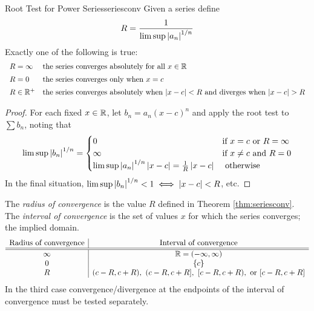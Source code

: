 \begin{thm}{Root Test for Power Series}{seriesconv}
Given a series  define\footnotemark
\[R=\frac 1{\limsup\left| a_n\right|^{1/n}}\]
Exactly one of the following is true:
\[\begin{array}{ll}
R=\infty&\text{the series converges absolutely for all $x\in\R$}\\[5pt]
R=0&\text{the series converges only when $x=c$}\\[5pt]
R\in\R^+&\text{the series converges absolutely when $\nm{x-c}<R$ and diverges when $\nm{x-c}>R$}
\end{array}\]
\end{thm}


\begin{proof}
For each fixed $x\in\mathbb{R}$, let $b_n=a_n(x-c)^n$ and apply the root test to $\sum b_n$, noting that
\begin{gather*}
\limsup\nm{b_n}^{1/n}=\begin{cases}
0&\text{if }x=c\text{ or }R=\infty\\
\infty&\text{if }x\neq c\text{ and }R=0\\
\limsup\nm{a_n}^{1/n}\nm{x-c}=\frac 1R\nm{x-c}&\text{ otherwise}
\end{cases}%
\end{gather*}
In the final situation, $\limsup\left| b_n\right|^{1/n}<1\iff \left| x-c\right|<R$, etc.
\end{proof}

\begin{defn}{}{}
The \emph{radius of convergence} is the value $R$ defined in Theorem \ref{thm:seriesconv}. The \emph{interval of convergence} is the set of values $x$ for which the series converges; the implied domain.
\[\begin{array}{c|c}
\text{Radius of convergence}&\text{Interval of convergence}\\\hline\hline
\infty&\mathbb{R}=(-\infty,\infty)\\
0&\{c\}\\
R&(c-R,c+R),\ (c-R,c+R],\ [c-R,c+R),\ \text{or }[c-R,c+R]
\end{array}\]
In the third case convergence/divergence at the endpoints of the interval of convergence must be tested separately.
\end{defn}

